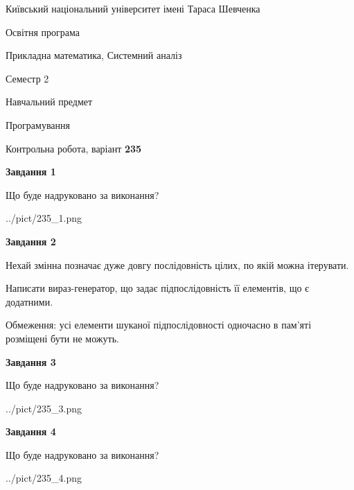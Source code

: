 \documentclass[12pt, ukrainian]{article}
\begin{document}
{{\begin {small}\par
{ \center  Київський національний університет імені Тараса Шевченка \par}
{\parbox {5 cm}{Освітня програма \hfill}{\parbox {8 cm}{Прикладна математика, Системний аналіз \hfill}}\parbox {5 cm}{\hfill Семестр 2}}\par
{\parbox {5 cm} {Навчальний предмет \hfill}\parbox {7 cm}{Програмування \hfill}\parbox {6cm}{\hfill}\par}\vspace{-7pt} \end{small}}{\center Контрольна робота, варіант  \No \textbf
{ 235 }\par}}
{
\begin {large}
{\begin {center}\textbf{Завдання 1}\end {center}}\par
Що буде надруковано за виконання?\par\par
\begin{center}
	{../pict/235_1.png}
\end{center}
\newpage

{\begin {center}\textbf{Завдання 2}\end {center}}\par
Нехай змінна  позначає дуже довгу послідовність цілих, по якій можна ітерувати.

Написати вираз-генератор, що задає підпослідовність її елементів, що є додатни\-ми.

Обмеження: усі елементи шуканої підпослідовності одночасно в пам'яті розміщені бути не можуть.\par
\newpage

{\begin {center}\textbf{Завдання 3}\end {center}}\par
Що буде надруковано за виконання?
\begin{center}
	{../pict/235_3.png}
\end{center}
\newpage

{\begin {center}\textbf{Завдання 4}\end {center}}\par
Що буде надруковано за виконання?\par
\begin{center}
	{../pict/235_4.png}
\end{center}
\newpage


\end{large}}
\end{document}
